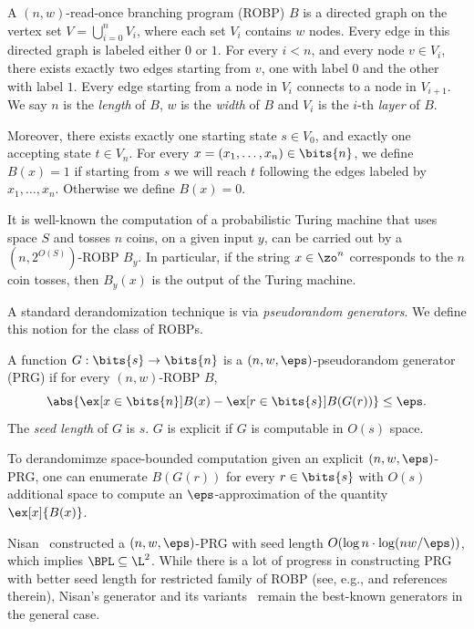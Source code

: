 \begin{definition}
A $(n,w)$-read-once branching program (ROBP) $B$ is a directed graph on the vertex set $V=\bigcup_{i=0}^n V_i$, where each set $V_i$ contains $w$ nodes. Every edge in this directed graph is labeled either $0$ or $1$. For every $i<n$, and every node $v\in V_i$, there exists exactly two edges starting from $v$, one with label $0$ and the other with label $1$. Every edge starting from a node in $V_i$ connects to a node in $V_{i+1}$.
We say $n$ is the \emph{length} of $B$, $w$ is the \emph{width} of $B$ and $V_i$ is the $i$-th \emph{layer} of $B$.

Moreover, there exists exactly one starting state $s\in V_0$, and exactly one accepting state $t\in V_n$. For every $x=(x_1,\dots,x_n)\in\bits{n}$, we define $B(x)=1$ if starting from $s$ we will reach $t$ following the edges labeled by $x_1,\dots,x_n$. Otherwise we define $B(x)=0$.
\end{definition}
It is well-known the computation of a probabilistic Turing machine that uses space $S$ and tosses $n$ coins,  on a given input $y$, can be carried out by a $(n,2^{O(S)})$-ROBP $B_y$. In particular, if the string $x \in \zo^n$ corresponds to the $n$ coin tosses, then  $B_y(x)$ is the output of the Turing machine. 

A standard derandomization technique is via \emph{pseudorandom generators}. We define this notion for the class of ROBPs.

\begin{definition}
A function $G:\bits{s}\to\bits{n}$ is a $(n,w,\eps)$-pseudorandom generator (PRG) if for every $(n,w)$-ROBP $B$,
$$\abs{\ex[x\in\bits{n}]{B(x)}-\ex[r\in\bits{s}]{B(G(r))}}\le\eps.$$
The \emph{seed length} of $G$ is $s$.   $G$ is explicit if $G$ is computable in $O(s)$ space.
\end{definition}
To derandomimze  space-bounded computation  given an explicit $(n,w,\eps)$-PRG, one can enumerate $B(G(r))$ for every $r\in\bits{s}$ with $O(s)$ additional space to compute an $\eps$-approximation of the quantity $\ex[x]{B(x)}$. 

Nisan~\cite{Nis92} constructed a $(n,w,\eps)$-PRG with seed length $O(\log n \cdot \log (nw/\eps))$, which implies $\BPL\subseteq \L^2$.   While there is a lot of progress in constructing PRG with better seed length for restricted family of ROBP (see, e.g., \cite{NZ96,Arm98,BV10,BDVY13,BRRY14,KNP11,De11,Ste12,MRT19} and references therein), Nisan's generator and its variants~\cite{Nis92,INW94,RR99} remain the best-known generators in the general case.
